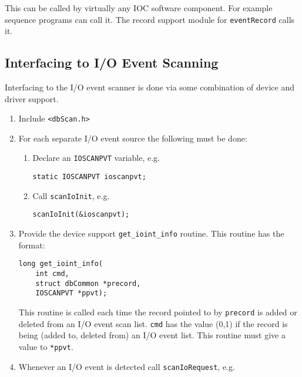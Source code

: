 This can be called by virtually any IOC software component.
For example sequence programs can call it.
The record support module for \verb|eventRecord| calls it.

\subsection{Interfacing to I/O Event Scanning}


Interfacing to the I/O event scanner is done via some combination of device and driver support.

\begin{enumerate}
\item Include \verb|<dbScan.h>|

\item For each separate I/O event source the following must be done:

\begin{enumerate}

\item Declare an \verb|IOSCANPVT| variable, e.g.

\begin{verbatim}
static IOSCANPVT ioscanpvt;
\end{verbatim}

\item Call \verb|scanIoInit|, e.g.

\begin{verbatim}
scanIoInit(&ioscanpvt);
\end{verbatim}
\end{enumerate}

\item Provide the device support \verb|get_ioint_info| routine.
This routine has the format:

\begin{verbatim}
long get_ioint_info(
    int cmd,
    struct dbCommon *precord,
    IOSCANPVT *ppvt);
\end{verbatim}

This routine is called each time the record pointed to by \verb|precord| is added or deleted from an I/O event scan list.
\verb|cmd| has the value (0,1) if the record is being (added to, deleted from) an I/O event list.
This routine must give a value to \verb|*ppvt|.

\item Whenever an I/O event is detected call \verb|scanIoRequest|, e.g.


\end{enumerate}
